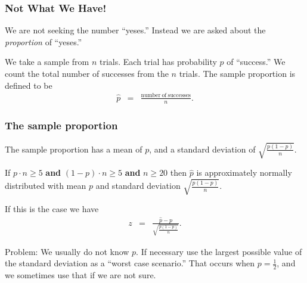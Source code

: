 \begin{frame}
  \frametitle{Not What We Have!}

  We are not seeking the number ``yeses.''
  Instead we are asked about the \textit{proportion} of ``yeses.''

  \vfill

  \begin{definition}

    We take a sample from $n$ trials. Each trial has probability $p$
    of ``success.'' We count the total number of successes from the
    $n$ trials.  The sample proportion is defined to be
    \begin{eqnarray*}
      \hat{p} & = & \frac{\mathrm{number~of~successes}}{n}.
    \end{eqnarray*}
    
  \end{definition}



\end{frame}

\begin{frame}
  \frametitle{The sample proportion}

  The sample proportion has a mean of $p$, and a standard deviation of
  $\sqrt{\frac{p(1-p)}{n}}$.

  \vfill

  {

    If $p\cdot n \geq 5$ \textbf{and} $(1-p)\cdot n \geq 5$
    \textbf{and} $n\geq 20$ then $\hat{p}$ is approximately normally
    distributed with mean $p$ and standard deviation
    $\sqrt{\frac{p(1-p)}{n}}$.

  }

  \vfill

  {
    If this is the case we have
    \begin{eqnarray*}
      z & = & \frac{\hat{p}-p}{\sqrt{\frac{p(1-p)}{n}}}.
    \end{eqnarray*}
  }

  \vfill

  {

    Problem: We usually do not know $p$. {\color{red}If necessary use
      the largest possible value of the standard deviation as a
      ``worst case scenario.''} That occurs when $p=\frac{1}{2}$, and
    we sometimes use that if we are not sure.

  }


\end{frame}


